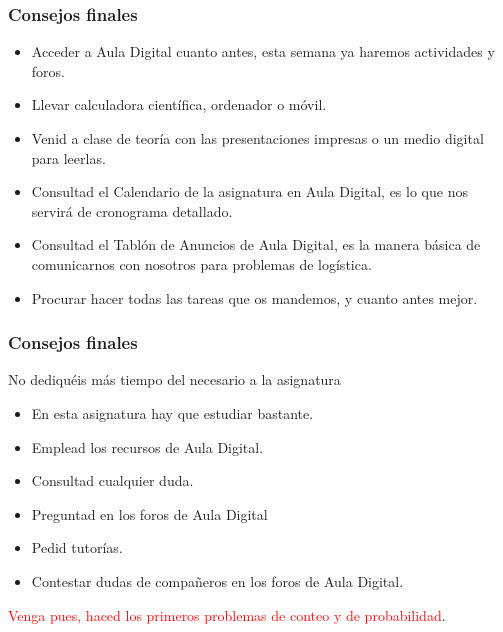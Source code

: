 \documentclass[12pt,t]{beamer}
\newcommand{\red}[1]{\textcolor{red}{#1}}
\renewcommand{\emph}[1]{{\color{red}#1}}
\theoremstyle{plain}
\theoremstyle{definition}
\begin{document}
\begin{frame}
\frametitle{Consejos finales}

\begin{itemize}
\item Acceder a  Aula Digital  cuanto antes, esta semana ya haremos actividades y foros.

\item Llevar calculadora científica, ordenador o móvil.

\item Venid a clase de teoría con las presentaciones impresas o un medio digital para leerlas.

\item Consultad el \emph{Calendario de la asignatura en Aula Digital}, es lo  que nos servirá de cronograma detallado.

\item Consultad el \emph{Tablón de Anuncios de Aula Digital}, es la manera básica de comunicarnos con nosotros para problemas de logística.

\item Procurar  hacer todas las tareas que os mandemos, y cuanto antes mejor.

\end{itemize}

\end{frame}


\begin{frame}
\frametitle{Consejos finales}

No dediquéis  más tiempo del necesario a la asignatura
\medskip

\begin{itemize}
\item En esta asignatura hay que estudiar bastante.
\medskip
\item Emplead los recursos de Aula Digital.
\item Consultad cualquier duda.
\item Preguntad en los foros de Aula Digital
\item Pedid tutorías.
\item Contestar dudas de compañeros en los foros de Aula Digital.
\end{itemize}
\vspace*{1cm}
\pause

\red{Venga pues, haced los primeros problemas de conteo y de probabilidad}.

\end{frame}
\end{document}
